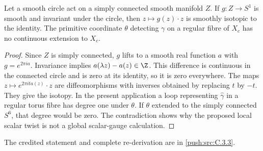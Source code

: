 \begin{proposition}\label{push:src:C.3.2}
Let a smooth circle act on a simply connected smooth manifold $Z$.
If $g:Z\to S^1$ is smooth and invariant under the circle, then
$z\mapsto g(z)\cdot z$ is smoothly isotopic to the identity.
The primitive coordinate $\theta$ detecting $\gamma$ on a regular
fibre of $X_c$ has no continuous extension to $X_c$.
\end{proposition}


\begin{proof}
Since $Z$ is simply connected, $g$ lifts to a smooth real function
$a$ with $g=e^{2\pi ia}$. Invariance implies
$a(\lambda z)-a(z)\in\Z$. This difference is continuous in the
connected circle and is zero at its identity, so it is zero
everywhere. The maps $z\mapsto e^{2\pi ita(z)}\cdot z$ are
diffeomorphisms with inverses obtained by replacing $t$ by $-t$.
They give the isotopy. In the present application a loop representing
$\widehat\gamma$ in a regular torus fibre has degree one under
$\theta$. If $\theta$ extended to the simply connected $S^6$,
that degree would be zero. The contradiction shows why the proposed local scalar twist is not a global scalar-gauge calculation.
\end{proof}

The credited statement and complete re-derivation are in \cref{push:src:C.3.3}.
